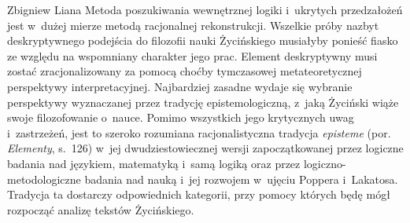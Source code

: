 \begin{artplenv}{Zbigniew Liana}
Metoda poszukiwania wewnętrznej logiki i~ukrytych przedzałożeń jest w~dużej mierze metodą racjonalnej rekonstrukcji.
Wszelkie próby nazbyt deskryptywnego podejścia do filozofii nauki Życińskiego musiałyby ponieść fiasko ze względu na
wspomniany charakter jego prac. Element deskryptywny musi zostać zracjonalizowany za pomocą choćby tymczasowej
metateoretycznej perspektywy interpretacyjnej. Najbardziej zasadne wydaje się wybranie perspektywy wyznaczanej przez
tradycję epistemologiczną, z~jaką Życiński wiąże swoje filozofowanie o~nauce. Pomimo wszystkich jego krytycznych uwag i~zastrzeżeń,
jest to szeroko rozumiana racjonalistyczna tradycja \textit{episteme} (por. \textit{Elementy}, s.~126) w~jej
dwudziestowiecznej wersji zapoczątkowanej przez logiczne badania nad językiem, matematyką i~samą logiką oraz przez
logiczno-metodologiczne badania nad nauką i~jej rozwojem w~ujęciu Poppera i~Lakatosa. Tradycja ta dostarczy
odpowiednich kategorii, przy pomocy których będę mógł rozpocząć analizę tekstów Życińskiego. 


\end{artplenv}
